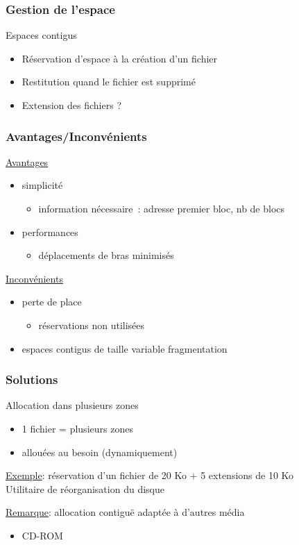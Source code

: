 \begin{frame}
\frametitle{Gestion de l'espace}
\alert{Espaces contigus}
\begin{itemize}
\item \alert{Réservation} d'espace à la création d'un fichier  
\item \alert{Restitution} quand le fichier est supprimé
\item \alert{Extension} des fichiers ?
\end{itemize}
\end{frame}

\begin{frame}
  \frametitle{Avantages/Inconvénients}
  \underline{Avantages}
  \begin{itemize}
  \item simplicité
    \begin{itemize}
    \item information nécessaire~: adresse premier bloc, nb de blocs
    \end{itemize}
  \item performances
    \begin{itemize}
    \item déplacements de bras minimisés
    \end{itemize}
  \end{itemize}
  
  \underline{Inconvénients}
  \begin{itemize}
  \item perte de place
    \begin{itemize}
    \item réservations non utilisées
    \end{itemize}
  \item espaces contigus de taille variable  fragmentation
  \end{itemize}
\end{frame}


\begin{frame}
\frametitle{Solutions}
Allocation dans plusieurs zones
\begin{itemize}
\item 1 fichier = plusieurs zones
\item allouées au besoin (dynamiquement)
\end{itemize}
\underline{Exemple}:
réservation d'un fichier de 20 Ko + 5 \alert{extensions} de 10 Ko\\
\vspace{0.5cm}
Utilitaire de réorganisation du disque\\
\vspace{0.5cm}

\underline{Remarque}: allocation contiguë adaptée à d'autres média
\begin{itemize}
\item CD-ROM
\end{itemize}
\end{frame}

